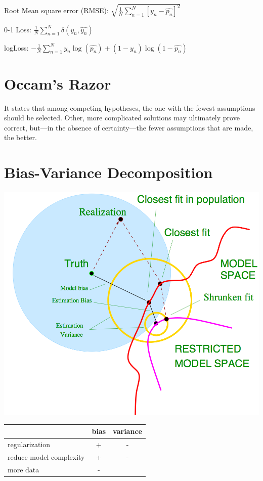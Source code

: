 \documentclass[10pt,a4paper,landscape]{article}
\begin{document}
\begin{multicols*}{4}
  Root Mean square error (RMSE): $\sqrt{\frac{1}{N} \sum_{n=1}^{N}\left[y_n- \hat{p_n} \right]^2}$

  0-1 Loss: $ \frac{1}{N} \sum_{n=1}^{N} \delta(y_n, \hat{y_n})$

  logLoss: $- \frac{1}{N}  \sum_{n=1}^{N} y_n \log(\hat{p_n}) + (1-y_n) \log(1-\hat{p_n})$

\section{Occam's Razor}
  It states that among competing hypotheses, the one with the fewest assumptions should be selected. Other, more complicated solutions may ultimately prove correct, but—in the absence of certainty—the fewer assumptions that are made, the better.

\section{Bias-Variance Decomposition}
  \begin{colfig}
    \centering
    \includegraphics[width=\linewidth]{images/bias-variance.png}
  \end{colfig}

  \begin{tabular}{ l || c | c }
                            & bias & variance \\
    \hline
    regularization          & +    & - \\
    reduce model complexity & +    & - \\
    more data               & -    & \\
    \hline
  \end{tabular}


\end{multicols*}
\end{document}
